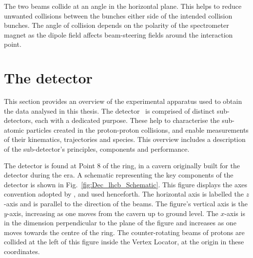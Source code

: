 The two beams collide at an angle in the horizontal plane. This helps to reduce unwanted collisions between the bunches either side of the intended collision bunches. The angle of collision depends on the polarity of the \lhcb spectrometer magnet as the dipole field affects beam-steering fields around the interaction point. 




\section{The \lhcb detector}

This section provides an overview of the experimental apparatus used to obtain the data analysed in this thesis.
The \lhcb detector~\cite{Alves:2008zz} is comprised of distinct sub-detectors, each with a dedicated purpose. These help to characterise the sub-atomic particles created in the proton-proton collisions, and enable measurements of their kinematics, trajectories and species.
This overview includes a description of the sub-detector's principles, components and performance. 

The \lhcb detector is found at Point 8 of the \lhc ring, in a cavern originally built for the \delphi detector during the \lep era. A schematic representing the key components of the \lhcb detector is shown in Fig.~\ref{fig:Dec_lhcb_Schematic}. This figure displays the axes convention adopted by \lhcb, and used henceforth. The horizontal axis is labelled the $z$-axis and is parallel to the direction of the beams. The figure's vertical axis is the $y$-axis, increasing as one moves from the cavern up to ground level. The $x$-axis is in the dimension perpendicular to the plane of the figure and increases as one moves towards the centre of the \lhc ring. The counter-rotating beams of protons are collided at the left of this figure inside the Vertex Locator, at the origin in these coordinates.   

